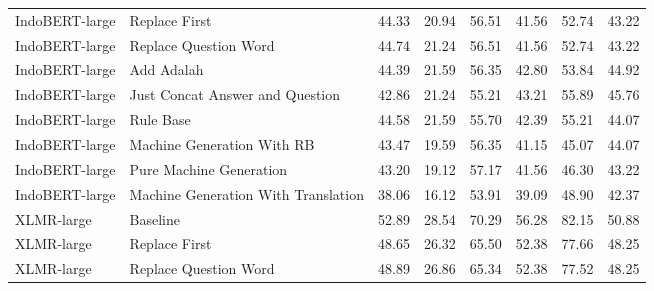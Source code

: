 \begin{table}[H]
\begin{tabular}{llrrrrrr}
IndoBERT-large &                       Replace First &                44.33 &                 20.94 &                56.51 &                 41.56 &                52.74 &                 43.22 \\
IndoBERT-large &               Replace Question Word &                44.74 &                 21.24 &                56.51 &                 41.56 &                52.74 &                 43.22 \\
IndoBERT-large &                          Add Adalah &                44.39 &                 21.59 &                56.35 &                 42.80 &                53.84 &                 44.92 \\
IndoBERT-large &     Just Concat Answer and Question &                42.86 &                 21.24 &                55.21 &                 43.21 &                55.89 &                 45.76 \\
IndoBERT-large &                           Rule Base &                44.58 &                 21.59 &                55.70 &                 42.39 &                55.21 &                 44.07 \\
IndoBERT-large &          Machine Generation With RB &                43.47 &                 19.59 &                56.35 &                 41.15 &                45.07 &                 44.07 \\
IndoBERT-large &             Pure Machine Generation &                43.20 &                 19.12 &                57.17 &                 41.56 &                46.30 &                 43.22 \\
IndoBERT-large & Machine Generation With Translation &                38.06 &                 16.12 &                53.91 &                 39.09 &                48.90 &                 42.37 \\
\hline
    XLMR-large &                            Baseline &                52.89 &                 28.54 &                70.29 &                 56.28 &                82.15 &                 50.88 \\
    XLMR-large &                       Replace First &                48.65 &                 26.32 &                65.50 &                 52.38 &                77.66 &                 48.25 \\
    XLMR-large &               Replace Question Word &                48.89 &                 26.86 &                65.34 &                 52.38 &                77.52 &                 48.25 \\

\end{tabular}
\end{table}
